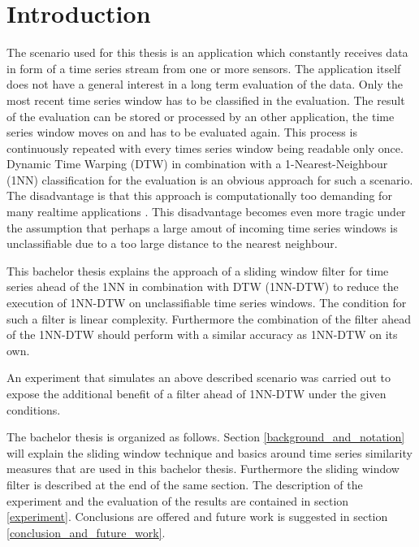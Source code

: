 \section{Introduction} \label{introduction}
The scenario used for this thesis is an application which constantly receives data in form of a time series stream from
one or more sensors. The application itself does not have a general interest in a long term evaluation of the data. Only
the most recent time series window has to be classified in the evaluation. The result of the evaluation can be stored or
processed by an other application, the time series window moves on and has to be evaluated again. This process is
continuously repeated with every times series window being readable only once. Dynamic Time Warping (DTW) in combination
with a 1-Nearest-Neighbour (1NN) classification for the evaluation is an obvious approach for such a scenario. The
disadvantage is that this approach is computationally too demanding for many realtime applications \cite{xi2006fast}.
This disadvantage becomes even more tragic under the assumption that perhaps a large amout of incoming time series
windows is unclassifiable due to a too large distance to the nearest neighbour.

This bachelor thesis explains the approach of a sliding window filter for time series ahead of the 1NN in combination
with DTW (1NN-DTW) to reduce the execution of 1NN-DTW on unclassifiable time series windows. The condition for such a
filter is linear complexity. Furthermore the combination of the filter ahead of the 1NN-DTW should perform with a
similar accuracy as 1NN-DTW on its own.

An experiment that simulates an above described scenario was carried out to expose the additional benefit of a filter
ahead of 1NN-DTW under the given conditions.%

The bachelor thesis is organized as follows. Section \ref{background_and_notation} will explain the sliding window
technique and basics around time series similarity measures that are used in this bachelor thesis. Furthermore
the sliding window filter is described at the end of the same section. The description of the experiment and the
evaluation of the results are contained in section \ref{experiment}. Conclusions are offered and future work
is suggested in section \ref{conclusion_and_future_work}.
